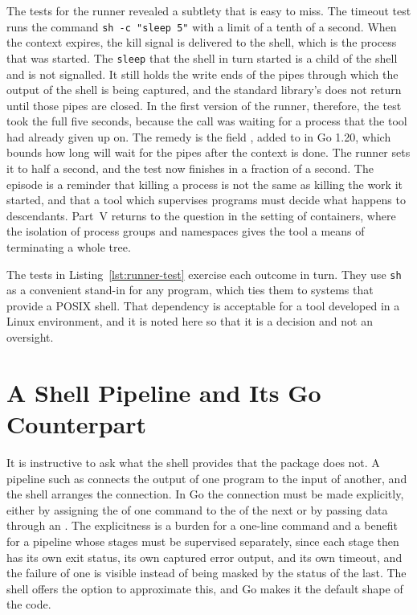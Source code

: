 The tests for the runner revealed a subtlety that is easy to miss. The timeout test runs the command \texttt{sh -c "sleep 5"} with a limit of a tenth of a second. When the context expires, the kill signal is delivered to the shell, which is the process that was started. The \texttt{sleep} that the shell in turn started is a child of the shell and is not signalled. It still holds the write ends of the pipes through which the output of the shell is being captured, and the standard library's  does not return until those pipes are closed. In the first version of the runner, therefore, the test took the full five seconds, because the call was waiting for a process that the tool had already given up on. The remedy is the field , added to  in Go 1.20, which bounds how long  will wait for the pipes after the context is done. The runner sets it to half a second, and the test now finishes in a fraction of a second. The episode is a reminder that killing a process is not the same as killing the work it started, and that a tool which supervises programs must decide what happens to descendants. Part~V returns to the question in the setting of containers, where the isolation of process groups and namespaces gives the tool a means of terminating a whole tree.


The tests in Listing~\ref{lst:runner-test} exercise each outcome in turn. They use \texttt{sh} as a convenient stand-in for any program, which ties them to systems that provide a POSIX shell. That dependency is acceptable for a tool developed in a Linux environment, and it is noted here so that it is a decision and not an oversight.

\section{A Shell Pipeline and Its Go Counterpart}

It is instructive to ask what the shell provides that the  package does not. A pipeline such as  connects the output of one program to the input of another, and the shell arranges the connection. In Go the connection must be made explicitly, either by assigning the  of one command to the  of the next or by passing data through an . The explicitness is a burden for a one-line command and a benefit for a pipeline whose stages must be supervised separately, since each stage then has its own exit status, its own captured error output, and its own timeout, and the failure of one is visible instead of being masked by the status of the last. The shell offers the option  to approximate this, and Go makes it the default shape of the code.

